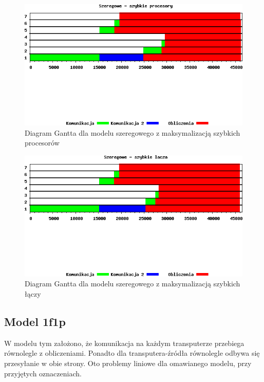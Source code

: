 \documentclass[a4paper,11pt, titlepage]{article}
\begin{document}
\begin{figure}[!p]
\includegraphics[width=1.0\textwidth]{wykresy/szeregowe_proc}
\caption{Diagram Gantta dla modelu szeregowego z maksymalizacją szybkich procesorów \label{szeregowe_p}}
\end{figure}

\begin{figure}[!p]
\includegraphics[width=1.0\textwidth]{wykresy/szeregowe_lacza}
\caption{Diagram Gantta dla modelu szeregowego z maksymalizacją szybkich łączy \label{szeregowe_l}}
\end{figure}

\subsection{Model 1f1p}
W modelu tym założono, że komunikacja na każdym transputerze przebiega równolegle z obliczeniami. Ponadto dla transputera-źródła równolegle odbywa się przesyłanie w obie strony. Oto problemy liniowe dla omawianego modelu, przy przyjętych oznaczeniach.
\end{document}
